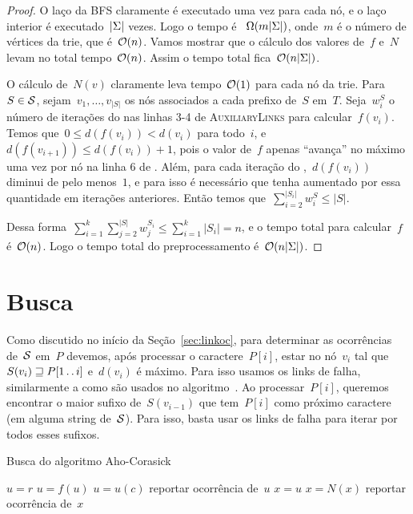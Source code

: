 \begin{proof}
O laço da BFS claramente é executado uma vez para cada nó, e o laço interior é executado~$|\Sigma|$ vezes. Logo o tempo é ~$\Omega(m|\Sigma|)$, onde~$m$ é o número de vértices da trie, que é~$\mathcal{O}(n)$. Vamos mostrar que o cálculo dos valores de~$f$ e~$N$ levam no total tempo~$\mathcal{O}(n)$. Assim o tempo total fica~$\mathcal{O}(n|\Sigma|)$.

O cálculo de~$N(v)$ claramente leva tempo~$\mathcal{O}(1)$ para cada nó da trie. Para~$S \in \mathcal{S}$, sejam~$v_1, \ldots, v_{|S|}$ os nós associados a cada prefixo de~$S$ em~$T$. Seja~$w^S_i$ o número de iterações do  nas linhas 3-4 de \textsc{AuxiliaryLinks} para calcular~$f(v_i)$. Temos que~$0 \leq d(f(v_i)) < d(v_i)$ para todo~$i$, e~${d(f(v_{i+1})) \leq d(f(v_i)) + 1}$, pois o valor de~$f$ apenas ``avança'' no máximo uma vez por nó na linha 6 de . Além, para cada iteração do ,~$d(f(v_i))$ diminui de pelo menos~$1$, e para isso é necessário que tenha aumentado por essa quantidade em iterações anteriores. Então temos que~$\sum\limits_{i=2}^{|S_i|}{w^S_i} \leq |S|$.

Dessa forma~$\sum\limits_{i=1}^k{\sum\limits_{j=2}^{|S|}{w^{S_i}_j}} \leq \sum\limits_{i=1}^k{|S_i|} = n$, e o tempo total para calcular~$f$ é~$\mathcal{O}(n)$.
Logo o tempo total do preprocessamento é~$\mathcal{O}(n|\Sigma|)$.
\end{proof}

\section{Busca}
\label{sec:ahobusca}

Como discutido no início da Seção~\ref{sec:linkoc}, para determinar as ocorrências de~$\mathcal{S}$ em~$P$ devemos, após processar o caractere~$P[i]$, estar no nó~$v_i$ tal que~$S(v_i) \sqsupseteq P[1\,.\,.\, i]$ e~$d(v_i)$ é máximo. Para isso usamos os links de falha, similarmente a como são usados no algoritmo~. Ao processar~$P[i]$, queremos encontrar o maior sufixo de~$S(v_{i-1})$ que tem~$P[i]$ como próximo caractere (em alguma string de~$\mathcal{S}$).
Para isso, basta usar os links de falha para iterar por todos esses sufixos.

\begin{algorithm}
\caption{Busca do algoritmo Aho-Corasick} \label{lst:ahobusca}
\begin{algorithmic}[1]
\State $u = r$
        \State $u = f(u)$
    \EndWhile
        \State $u = u(c)$
    \EndIf
        \State reportar ocorrência de~$u$
    \EndIf
    \State $x = u$
        \State $x = N(x)$
        \State reportar ocorrência de~$x$
    \EndWhile
\EndFor
\end{algorithmic}
\end{algorithm}


